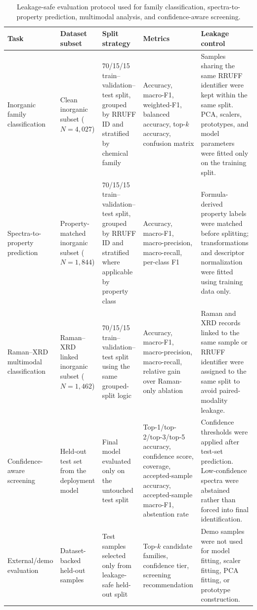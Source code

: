 \begin{table}[htbp]
\centering
\caption{Leakage-safe evaluation protocol used for family classification, spectra-to-property prediction, multimodal analysis, and confidence-aware screening.}
\label{tab:protocol}
\footnotesize
\renewcommand{\arraystretch}{1.18}
\begin{tabularx}{\textwidth}{p{} p{} X p{} X}
\toprule
\textbf{Task} & \textbf{Dataset subset} & \textbf{Split strategy} & \textbf{Metrics} & \textbf{Leakage control} \\
\midrule

Inorganic family classification
& Clean inorganic subset ($N=4{,}027$)
& 70/15/15 train--validation--test split, grouped by RRUFF ID and stratified by chemical family
& Accuracy, macro-F1, weighted-F1, balanced accuracy, top-$k$ accuracy, confusion matrix
& Samples sharing the same RRUFF identifier were kept within the same split. PCA, scalers, prototypes, and model parameters were fitted only on the training split. \\

Spectra-to-property prediction
& Property-matched inorganic subset ($N=1{,}844$)
& 70/15/15 train--validation--test split, grouped by RRUFF ID and stratified where applicable by property class
& Accuracy, macro-F1, macro-precision, macro-recall, per-class F1
& Formula-derived property labels were matched before splitting; transformations and descriptor normalization were fitted using training data only. \\

Raman--XRD multimodal classification
& Raman--XRD linked inorganic subset ($N=1{,}462$)
& 70/15/15 train--validation--test split using the same grouped-split logic
& Accuracy, macro-F1, macro-precision, macro-recall, relative gain over Raman-only ablation
& Raman and XRD records linked to the same sample or RRUFF identifier were assigned to the same split to avoid paired-modality leakage. \\

Confidence-aware screening
& Held-out test set from the deployment model
& Final model evaluated only on the untouched test split
& Top-1/top-2/top-3/top-5 accuracy, confidence score, coverage, accepted-sample accuracy, accepted-sample macro-F1, abstention rate
& Confidence thresholds were applied after test-set prediction. Low-confidence spectra were abstained rather than forced into final identification. \\

External/demo evaluation
& Dataset-backed held-out samples
& Test samples selected only from leakage-safe held-out split
& Top-$k$ candidate families, confidence tier, screening recommendation
& Demo samples were not used for model fitting, scaler fitting, PCA fitting, or prototype construction. \\

\bottomrule
\end{tabularx}
\end{table}
